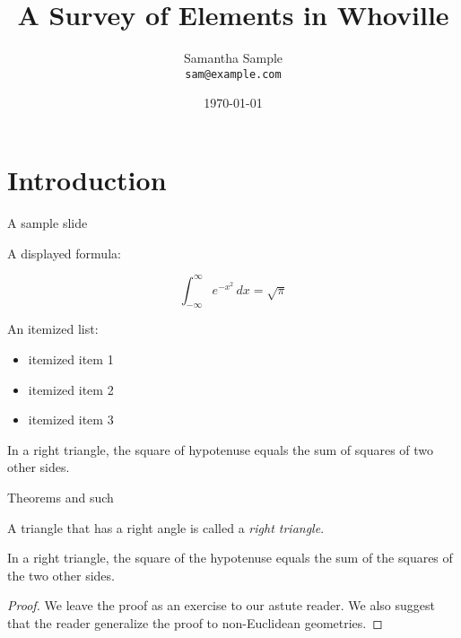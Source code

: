 \documentclass[sans,mathserif]{beamer}
\title{A Survey of Elements in Whoville}
\author{Samantha Sample \\ \texttt{sam@example.com}}
\institute[The Institute of Advanced Study]
{
Department of Chemistry \\
Whoville College \\
}
\date{\today}
\begin{document}
\section{Introduction}


\begin{frame}
  \titlepage
\end{frame}


\begin{frame}{A sample slide}

A displayed formula:

\[
  \int_{-\infty}^\infty e^{-x^2} \, dx = \sqrt{\pi}
\]

An itemized list:

\begin{itemize}
  \item itemized item 1
  \item itemized item 2
  \item itemized item 3
\end{itemize}

\begin{theorem}
  In a right triangle, the square of hypotenuse equals
  the sum of squares of two other sides.
\end{theorem}

\end{frame}


\begin{frame}{Theorems and such}

\begin{definition}
  A triangle that has a right angle is called
  a \emph{right triangle}.
\end{definition}

\begin{theorem}
  In a right triangle, the square of the hypotenuse
  equals the sum of the squares of the two other sides.
\end{theorem}

\begin{proof}
  We leave the proof as an exercise to our astute reader.
  We also suggest that the reader generalize the proof to
  non-Euclidean geometries.
\end{proof}

\end{frame}
\end{document}
